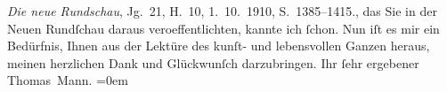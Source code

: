 \begin{ledgroupsized}[t]{13cm}
{{{                                \emph{Die neue Rundschau}, Jg. 21, H. 10,
                                1. 10. 1910, S. 1385–1415.}}}\label{K_L01986_1h}, das Sie in
                    der Neuen Rundſchau daraus veroeffentlichten,
                    kannte ich ſchon. Nun {\pb}iſt es mir ein
                    Bedürfnis, Ihnen aus der Lektüre des kunſt- und lebensvollen Ganzen heraus,
                    meinen herzlichen Dank und Glückwunſch darzubringen.\pend
           \pstart
           Ihr ſehr ergebener{\\[\baselineskip]}\spacefill\mbox{Thomas Mann.}\pend
           \leftskip=0em{}\endnumbering{}\end{ledgroupsized}  \newcommand{\dateiname}{L01986}\newcommand{\titel}{Thomas Mann an Arthur Schnitzler, 22. 11. 1910}\newcommand{\editorInnen}{Martin Anton Müller und Gerd-Hermann Susen}
      